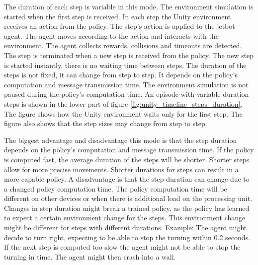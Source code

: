 The duration of each step is variable in this mode. The environment simulation is started when the first step is received. In each step the Unity environment receives an action from the policy. The step's action is applied to the jetbot agent. The agent moves according to the action and interacts with the environment. The agent collects rewards, collisions and timeouts are detected. The step is terminated when a new step is received from the policy. The new step is started instantly, there is no waiting time between steps.
The duration of the steps is not fixed, it can change from step to step. It depends on the policy's computation and message transmission time. The environment simulation is not paused during the policy's computation time.
An episode with variable duration steps is shown in the lower part of figure \ref{fig:unity_timeline_steps_duration}. The figure shows how the Unity environment waits only for the first step. The figure also shows that the step sizes may change from step to step.

The biggest advantage and disadvantage this mode is that the step duration depends on the policy's computation and message transmission time. If the policy is computed fast, the average duration of the steps will be shorter. Shorter steps allow for more precise movements. Shorter durations for steps can result in a more capable policy.
A disadvantage is that the step duration can change due to a changed policy computation time. The policy computation time will be different on other devices or when there is additional load on the processing unit.
Changes in step duration might break a trained policy, as the policy has learned to expect a certain environment change for the steps. This environment change might be different for steps with different durations.
Example: The agent might decide to turn right, expecting to be able to stop the turning within 0.2 seconds. If the next step is computed too slow the agent might not be able to stop the turning in time. The agent might then crash into a wall.


\usetikzlibrary{decorations.pathreplacing}
\newcommand\offset{-3}

